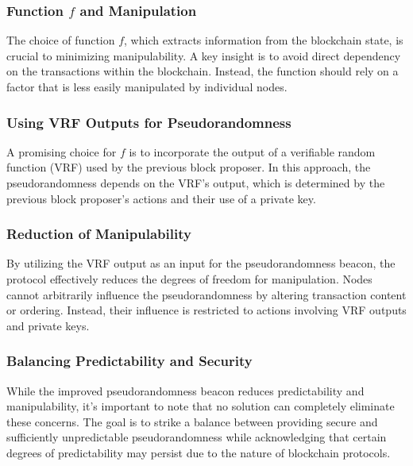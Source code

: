 \subsubsection{Function $f$ and Manipulation}
The choice of function $f$, which extracts information from the blockchain state, is crucial to minimizing manipulability. A key insight is to avoid direct dependency on the transactions within the blockchain. Instead, the function should rely on a factor that is less easily manipulated by individual nodes.

\subsubsection{Using VRF Outputs for Pseudorandomness}
A promising choice for $f$ is to incorporate the output of a verifiable random function (VRF) used by the previous block proposer. In this approach, the pseudorandomness depends on the VRF's output, which is determined by the previous block proposer's actions and their use of a private key.

\subsubsection{Reduction of Manipulability}
By utilizing the VRF output as an input for the pseudorandomness beacon, the protocol effectively reduces the degrees of freedom for manipulation. Nodes cannot arbitrarily influence the pseudorandomness by altering transaction content or ordering. Instead, their influence is restricted to actions involving VRF outputs and private keys.

\subsubsection{Balancing Predictability and Security}
While the improved pseudorandomness beacon reduces predictability and manipulability, it's important to note that no solution can completely eliminate these concerns. The goal is to strike a balance between providing secure and sufficiently unpredictable pseudorandomness while acknowledging that certain degrees of predictability may persist due to the nature of blockchain protocols.

